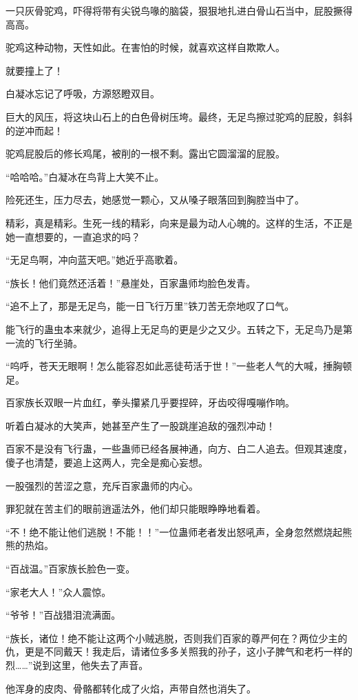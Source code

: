 \begin{this_body}
一只灰骨驼鸡，吓得将带有尖锐鸟喙的脑袋，狠狠地扎进白骨山石当中，屁股撅得高高。

驼鸡这种动物，天性如此。在害怕的时候，就喜欢这样自欺欺人。

就要撞上了！

白凝冰忘记了呼吸，方源怒瞪双目。

巨大的风压，将这块山石上的白色骨树压垮。最终，无足鸟擦过驼鸡的屁股，斜斜的逆冲而起！

驼鸡屁股后的修长鸡尾，被削的一根不剩。露出它圆溜溜的屁股。

“哈哈哈。”白凝冰在鸟背上大笑不止。

险死还生，压力尽去，她感觉一颗心，又从嗓子眼落回到胸腔当中了。

精彩，真是精彩。生死一线的精彩，向来是最为动人心魄的。这样的生活，不正是她一直想要的，一直追求的吗？

“无足鸟啊，冲向蓝天吧。”她近乎高歌着。

“族长！他们竟然还活着！”悬崖处，百家蛊师均脸色发青。

“追不上了，那是无足鸟，能一日飞行万里”铁刀苦无奈地叹了口气。

能飞行的蛊虫本来就少，追得上无足鸟的更是少之又少。五转之下，无足鸟乃是第一流的飞行坐骑。

“呜呼，苍天无眼啊！怎么能容忍如此恶徒苟活于世！”一些老人气的大喊，捶胸顿足。

百家族长双眼一片血红，拳头攥紧几乎要捏碎，牙齿咬得嘎嘣作响。

听着白凝冰的大笑声，她甚至产生了一股跳崖追敌的强烈冲动！

百家不是没有飞行蛊，一些蛊师已经各展神通，向方、白二人追去。但观其速度，傻子也清楚，要追上这两人，完全是痴心妄想。

一股强烈的苦涩之意，充斥百家蛊师的内心。

罪犯就在苦主们的眼前逍遥法外，他们却只能眼睁睁地看着。

“不！绝不能让他们逃脱！不能！！”一位蛊师老者发出怒吼声，全身忽然燃烧起熊熊的热焰。

“百战温。”百家族长脸色一变。

“家老大人！”众人震惊。

“爷爷！”百战猎泪流满面。

“族长，诸位！绝不能让这两个小贼逃脱，否则我们百家的尊严何在？两位少主的仇，更是不同戴天！我走后，请诸位多多关照我的孙子，这小子脾气和老朽一样的烈……”说到这里，他失去了声音。

他浑身的皮肉、骨骼都转化成了火焰，声带自然也消失了。


\end{this_body}
